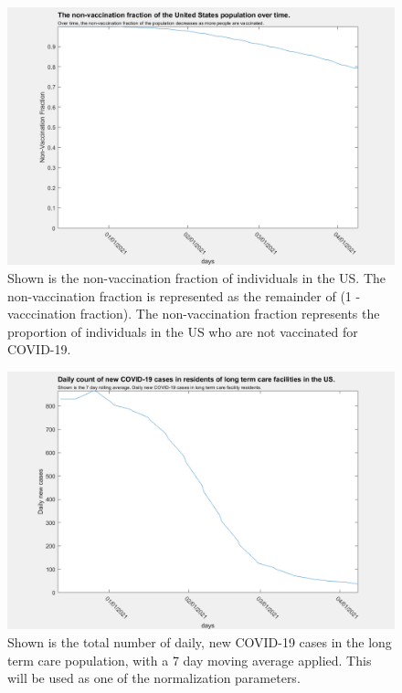 \documentclass[twoside]{article}
\begin{document}
\begin{multicols}{2}
\begin{figure}[H]
	\includegraphics[width=\linewidth]{images/non_vac_fraction_US.png}
	\caption{Shown is the non-vaccination fraction of individuals in the US. The non-vaccination fraction is represented as the remainder of (1 - vacccination fraction). The non-vaccination fraction represents the proportion of individuals in the US who are not vaccinated for COVID-19. }
	\label{fig:images/non_vac_fraction_USLabel}
\end{figure}

\begin{figure}[H]
	\includegraphics[width=\linewidth]{images/usa_daily_ltc_cases_processed.png}
	\caption{Shown is the total number of daily, new COVID-19 cases in the long term care population, with a 7 day moving average applied. This will be used as one of the normalization parameters.}
	\label{fig:images/usa_daily_ltc_cases_processedLabel}
\end{figure}


\end{multicols}
\end{document}
